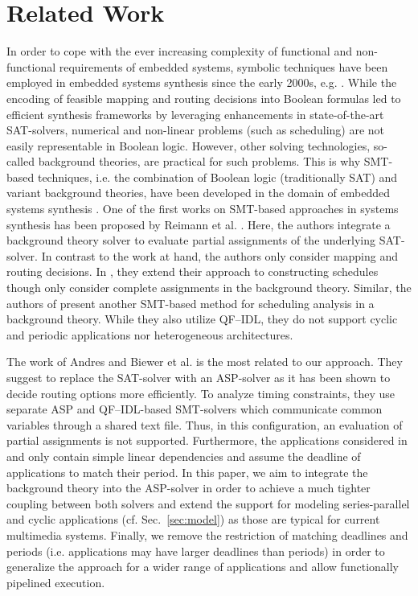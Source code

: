 \section{Related Work}
\label{sec:relatedwork}
In order to cope with the ever increasing complexity of functional and non-functional requirements of embedded systems, symbolic techniques have been employed in embedded systems synthesis since the early 2000s, e.g. \cite{Haubelt2003,Lukasiewycz2009,Lukasiewycz2012}. While the encoding of feasible mapping and routing decisions into Boolean formulas led to efficient synthesis frameworks by leveraging enhancements in state-of-the-art SAT-solvers, numerical and non-linear problems (such as scheduling) are not easily representable in Boolean logic. However, other solving technologies, so-called background theories, are practical for such problems. This is why SMT-based techniques, i.e. the combination of Boolean logic (traditionally SAT) and variant background theories, have been developed in the domain of embedded systems synthesis \cite{Reimann2010,Andres2015,Biewer2015,Liu2011}. One of the first works on SMT-based approaches in systems synthesis has been proposed by Reimann et al. \cite{Reimann2010}. Here, the authors integrate a background theory solver to evaluate partial assignments of the underlying SAT-solver. In contrast to the work at hand, the authors only consider mapping and routing decisions. In \cite{Reimann2011}, they extend their approach to constructing schedules though only consider complete assignments in the background theory. Similar, the authors of \cite{Liu2011} present another SMT-based method for scheduling analysis in a background theory. While they also utilize QF--IDL, they do not support cyclic and periodic applications nor heterogeneous architectures. \par The work of Andres and Biewer et al. \cite{Andres2015,Biewer2015,Biewer2014,Biewer2014a} is the most related to our approach. They suggest to replace the SAT-solver with an ASP-solver as it has been shown to decide routing options more efficiently. To analyze timing constraints, they use separate ASP and QF--IDL-based SMT-solvers which communicate common variables through a shared text file. Thus, in this configuration, an evaluation of partial assignments is not supported. Furthermore, the applications considered in \cite{Andres2015} and \cite{Biewer2015} only contain simple linear dependencies and assume the deadline of applications to match their period. In this paper, we aim to integrate the background theory into the ASP-solver in order to achieve a much tighter coupling between both solvers and extend the support for modeling series-parallel and cyclic applications (cf. Sec.~\ref{sec:model}) as those are typical for current multimedia systems. Finally, we remove the restriction of matching deadlines and periods (i.e. applications may have larger deadlines than periods) in order to generalize the approach for a wider range of applications and allow functionally pipelined execution. 